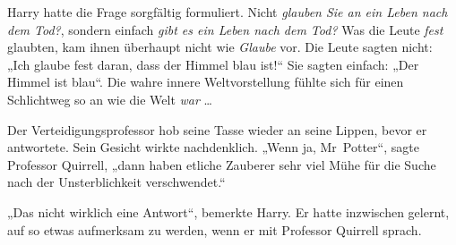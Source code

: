 Harry hatte die Frage sorgfältig formuliert. Nicht \emph{glauben Sie an ein Leben nach dem Tod?}, sondern einfach \emph{gibt es ein Leben nach dem Tod?} Was die Leute \emph{fest} glaubten, kam ihnen überhaupt nicht wie \emph{Glaube} vor. Die Leute sagten nicht: „Ich glaube fest daran, dass der Himmel blau ist!“ Sie sagten einfach: „Der Himmel ist blau“. Die wahre innere Weltvorstellung fühlte sich für einen Schlichtweg so an wie die Welt \emph{war} …

Der Verteidigungsprofessor hob seine Tasse wieder an seine Lippen, bevor er antwortete. Sein Gesicht wirkte nachdenklich. „Wenn ja, Mr~Potter“, sagte Professor Quirrell, „dann haben etliche Zauberer sehr viel Mühe für die Suche nach der Unsterblichkeit verschwendet.“

„Das nicht wirklich eine Antwort“, bemerkte Harry. Er hatte inzwischen gelernt, auf so etwas aufmerksam zu werden, wenn er mit Professor Quirrell sprach.

